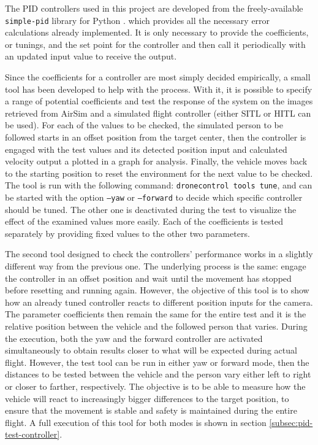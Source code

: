 The PID controllers used in this project are developed from the freely-available \texttt{simple-pid} library for Python \cite{pid-library}. which provides all the necessary error calculations already implemented.
It is only necessary to provide the coefficients, or tunings, and the set point for the controller and then call it periodically with an updated input value to receive the output.

Since the coefficients for a controller are most simply decided empirically, a small tool has been developed to help with the process.
With it, it is possible to specify a range of potential coefficients and test the response of the system on the images retrieved from AirSim and a simulated flight controller (either SITL or HITL can be used).
For each of the values to be checked, the simulated person to be followed starts in an offset position from the target center, then the controller is engaged with the test values and its detected position input and calculated velocity output a plotted in a graph for analysis.
Finally, the vehicle moves back to the starting position to reset the environment for the next value to be checked.
The tool is run with the following command: \texttt{dronecontrol tools tune}, and can be started with the option \texttt{--yaw} or \texttt{--forward} to decide which specific controller should be tuned.
The other one is deactivated during the test to visualize the effect of the examined values more easily.
Each of the coefficients is tested separately by providing fixed values to the other two parameters.

The second tool designed to check the controllers' performance works in a slightly different way from the previous one.
The underlying process is the same: engage the controller in an offset position and wait until the movement has stopped before resetting and running again.
However, the objective of this tool is to show how an already tuned controller reacts to different position inputs for the camera.
The parameter coefficients then remain the same for the entire test and it is the relative position between the vehicle and the followed person that varies.
During the execution, both the yaw and the forward controller are activated simultaneously to obtain results closer to what will be expected during actual flight.
However, the test tool can be run in either yaw or forward mode, then the distances to be tested between the vehicle and the person vary either left to right or closer to farther, respectively.
The objective is to be able to measure how the vehicle will react to increasingly bigger differences to the target position, to ensure that the movement is stable and safety is maintained during the entire flight.
A full execution of this tool for both modes is shown in section \ref{subsec:pid-test-controller}.


